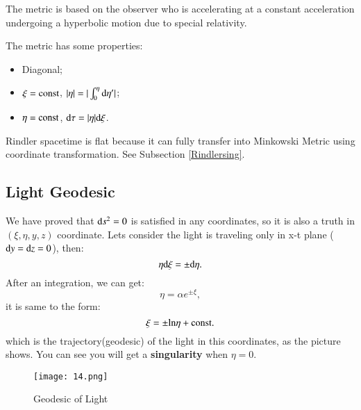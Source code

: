 \documentclass[openany,10pt]{book}
\theoremstyle{definition}
\theoremstyle{definition}
\theoremstyle{remark}
\begin{document}
The metric is based on the observer who is accelerating at a constant acceleration undergoing a hyperbolic motion due to special relativity.

The metric has some properties:
\begin{itemize}
    \item Diagonal;
\item $\xi={\rm const}$, $|\eta|=|\int_0^\eta{\rm d}\eta'|$;
\item $\eta={\rm const}$, ${\rm d}\tau=|\eta|{\rm d}\xi$.\\
\end{itemize}

Rindler spacetime is flat because it can fully transfer into Minkowski Metric using coordinate transformation. See Subsection \ref{Rindlersing}.


\subsection{Light Geodesic}

We have proved that ${\rm d}s^2=0$ is satisfied in any coordinates, so it is also a truth in $(\xi,\eta,y,z)$ coordinate. Lets consider the light is traveling only in x-t plane (${\rm d}y={\rm d}z=0$), then:
\begin{equation}
    \eta{\rm d}\xi=\pm {\rm d}\eta.
\end{equation}
After an integration, we can get:
\begin{equation}
    \eta=\alpha e^{\pm \xi},
\end{equation}
it is same to the form:
\begin{equation}
    \xi=\pm{\rm ln}\eta+{\rm const}.
\end{equation}
which is the trajectory(geodesic) of the light in this coordinates, as the picture shows. You can see you will get a {\bfseries singularity} when $\eta=0$.

\begin{figure}[htbp]
  \centering
    \texttt{[image: 14.png]}
 \caption{Geodesic of Light}
\end{figure}
\end{document}

